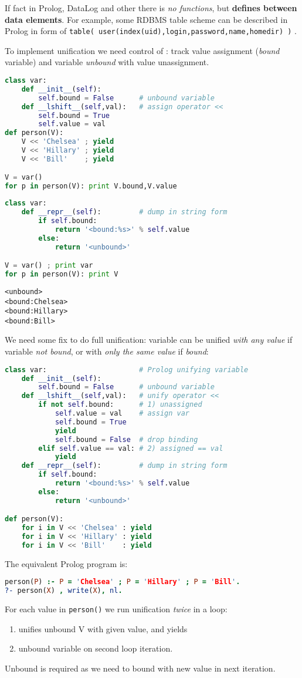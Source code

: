 If fact in Prolog, DataLog and other  there is \emph{no
functions}, but \textbf{ defines  between data
elements}.
For example, some RDBMS table scheme can be described in Prolog in form of
 \verb|table( user(index(uid),login,password,name,homedir) )| .

\bigskip
To implement unification we need control of : track value
assignment (\emph{bound} variable) and variable \emph{unbound} with value
unassignment.
\begin{lstlisting}[language=Python]
class var:
    def __init__(self):
        self.bound = False  	# unbound variable
    def __lshift__(self,val):	# assign operator <<
        self.bound = True
        self.value = val
def person(V):
    V << 'Chelsea' ; yield
    V << 'Hillary' ; yield
    V << 'Bill'    ; yield

V = var()
for p in person(V): print V.bound,V.value
\end{lstlisting}

\begin{lstlisting}[language=Python]
class var:
    def __repr__(self):         # dump in string form
        if self.bound:
            return '<bound:%s>' % self.value
        else:
            return '<unbound>'

V = var() ; print var
for p in person(V): print V
\end{lstlisting}
\begin{lstlisting}
<unbound>
<bound:Chelsea>
<bound:Hillary>
<bound:Bill>
\end{lstlisting}
We need some fix to do full unification: variable can be unified \emph{with any
value} if variable \emph{not bound}, or with \emph{only the same value} if \emph{bound}:
\begin{lstlisting}[language=Python]
class var:						# Prolog unifying variable
	def __init__(self):
		self.bound = False      # unbound variable
	def __lshift__(self,val):   # unify operator <<
		if not self.bound:		# 1) unassigned
			self.value = val	# assign var
			self.bound = True
			yield
			self.bound = False	# drop binding
		elif self.value == val:	# 2) assigned == val
			yield
	def __repr__(self):         # dump in string form
		if self.bound:
			return '<bound:%s>' % self.value
		else:
			return '<unbound>'

def person(V):
	for i in V << 'Chelsea'	: yield
	for i in V << 'Hillary'	: yield
	for i in V << 'Bill'	: yield
\end{lstlisting}
The equivalent Prolog program is:
\begin{lstlisting}[language=Prolog]
person(P) :- P = 'Chelsea' ; P = 'Hillary' ; P = 'Bill'.
?- person(X) , write(X), nl.
\end{lstlisting}
For each value in \verb|person()| we run unification \emph{twice} in a loop:
\begin{enumerate}[nosep]
	\item unifies unbound V with given value, and yields
	\item unbound variable on second loop iteration.
\end{enumerate}
Unbound is required as we need to bound with new value in next iteration.

